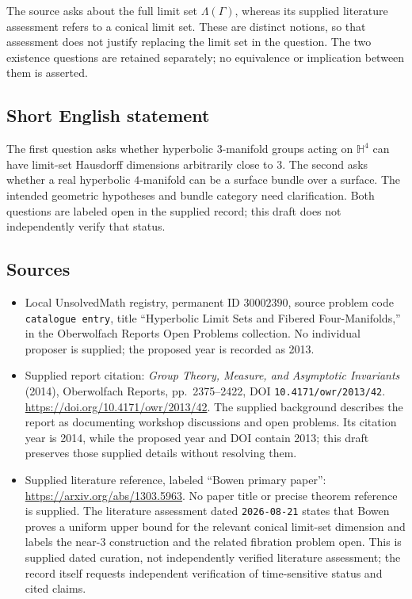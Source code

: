 \documentclass[11pt]{article}
\begin{document}
The source asks about the full limit set \(\Lambda(\Gamma)\), whereas its supplied literature assessment refers to a conical limit set. These are distinct notions, so that assessment does not justify replacing the limit set in the question. The two existence questions are retained separately; no equivalence or implication between them is asserted.
\subsection{Short English statement}
The first question asks whether hyperbolic \(3\)-manifold groups acting on \(\mathbb H^4\) can have limit-set Hausdorff dimensions arbitrarily close to \(3\). The second asks whether a real hyperbolic \(4\)-manifold can be a surface bundle over a surface. The intended geometric hypotheses and bundle category need clarification. Both questions are labeled open in the supplied record; this draft does not independently verify that status.
\subsection{Sources}
\begin{itemize}
\item Local UnsolvedMath registry, permanent ID \(30002390\), source problem code \texttt{catalogue entry}, title ``Hyperbolic Limit Sets and Fibered Four-Manifolds,'' in the Oberwolfach Reports Open Problems collection. No individual proposer is supplied; the proposed year is recorded as 2013.
\item Supplied report citation: \emph{Group Theory, Measure, and Asymptotic Invariants} (2014), Oberwolfach Reports, pp.~2375--2422, DOI \texttt{10.4171/owr/2013/42}. \url{https://doi.org/10.4171/owr/2013/42}. The supplied background describes the report as documenting workshop discussions and open problems. Its citation year is 2014, while the proposed year and DOI contain 2013; this draft preserves those supplied details without resolving them.
\item Supplied literature reference, labeled ``Bowen primary paper'': \url{https://arxiv.org/abs/1303.5963}. No paper title or precise theorem reference is supplied. The literature assessment dated \texttt{2026-08-21} states that Bowen proves a uniform upper bound for the relevant conical limit-set dimension and labels the near-\(3\) construction and the related fibration problem open. This is supplied dated curation, not independently verified literature assessment; the record itself requests independent verification of time-sensitive status and cited claims.
\end{itemize}
\end{document}
